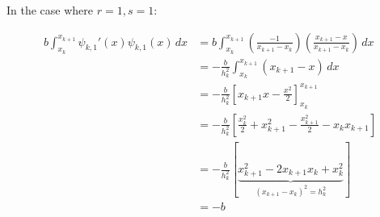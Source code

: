 In the case where $r = 1, s = 1$:

\begin{align*}
	b\int_{x_k}^{x_{k+1}}\psi_{k,1}'(x)\psi_{k,1}(x)\, dx
      &= b\int_{x_k}^{x_{k+1}}\left(\frac{-1}{x_{k+1} - x_k}\right)
                              \left(\frac{x_{k+1} - x}{x_{k+1} - x_k}\right)\, dx \\
      &= -\frac{b}{h_k^2}\int_{x_k}^{x_{k+1}}(x_{k+1} - x)\, dx \\
      &= -\frac{b}{h_k^2}\left[x_{k+1}x - \frac{x^2}{2}\right]_{x_k}^{x_{k+1}} \\
      &= -\frac{b}{h_k^2}\left[\frac{x_k^2}{2} + x_{k+1}^2 -\frac{x_{k+1}^2}{2}
                               - x_kx_{k+1}\right] \\
      &= -\frac{b}{h_k^2}
            [\underbrace{x_{k+1}^2 - 2x_{k+1}x_k + x_k^2}_{(x_{k+1} - x_k)^2 = h_k^2}] \\
      &= -b
\end{align*}